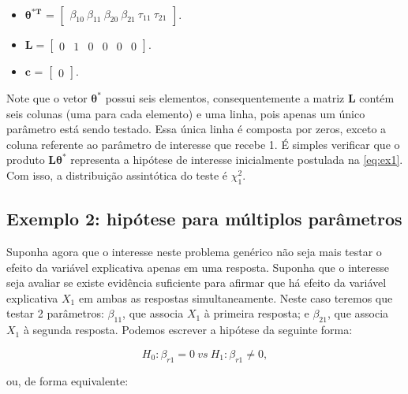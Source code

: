 \begin{itemize}
  
  \item $\boldsymbol{\theta^{*T}}$ = $\begin{bmatrix} \beta_{10} \  \beta_{11} \ \beta_{20} \ \beta_{21} \ \tau_{11} \ \tau_{21} \end{bmatrix}$.

\item $\boldsymbol{L} = \begin{bmatrix} 0 & 1 & 0 & 0 & 0 & 0  \end{bmatrix}.$
 
\item $\boldsymbol{c}$ = $\begin{bmatrix} 0 \end{bmatrix}.$

\end{itemize}

Note que o vetor $\boldsymbol{\theta^{*}}$ possui seis elementos, consequentemente a matriz $\boldsymbol{L}$ contém seis colunas (uma para cada elemento) e uma linha, pois apenas um único parâmetro está sendo testado. Essa única linha é composta por zeros, exceto a coluna referente ao parâmetro de interesse que recebe 1. É simples verificar que o produto $\boldsymbol{L}\boldsymbol{\theta^{*}}$ representa a hipótese de interesse inicialmente postulada na \autoref{eq:ex1}. Com isso, a distribuição assintótica do teste é $\chi^2_1$.

\subsection{Exemplo 2: hipótese para múltiplos parâmetros}\label{sec:ex2}

Suponha agora que o interesse neste problema genérico não seja mais testar o efeito da variável explicativa apenas em uma resposta. Suponha que o interesse seja avaliar se existe evidência suficiente para afirmar que há efeito da variável explicativa $X_1$ em ambas as respostas simultaneamente. Neste caso teremos que testar 2 parâmetros: $\beta_{11}$, que associa $X_1$ à primeira resposta; e $\beta_{21}$, que associa $X_1$ à segunda resposta. Podemos escrever a hipótese da seguinte forma:

\begin{equation}
\label{eq:ex2}
H_0: \beta_{r1} = 0 \ vs \ H_1: \beta_{r1} \neq 0,
\end{equation}

\noindent ou, de forma equivalente:

